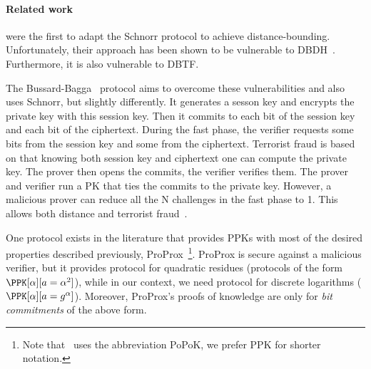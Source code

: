 \paragraph*{Related work}%
\label{related-work}

\textcite{DistanceBounding} were the first to adapt the Schnorr
protocol to achieve distance-bounding.
Unfortunately, their approach has been shown to be vulnerable to 
\ac{DBDH}~\cite{DistanceBounding,TamarinDB}.
Furthermore, it is also vulnerable to \ac{DBTF}.

The Bussard-Bagga~\cite{Bussard-Bagga} protocol aims to overcome these
vulnerabilities and also uses Schnorr, but slightly
differently. It generates a sesson key and encrypts the private key
with this session key. Then it commits to each bit of the session key
and each bit of the ciphertext. During the fast phase, the verifier requests some bits from the session key and some from the ciphertext. Terrorist fraud is based on that knowing both session key and ciphertext one can compute the private key.
The prover then opens the commits, the verifier verifies them.
The prover and verifier run a \ac{PK} that ties the commits to the private key.
However, a malicious prover can reduce all the N challenges in the fast phase
to 1. This allows both distance and terrorist
fraud~\cite{Bussard-Bagga-attack}.

One protocol exists in the literature that provides \acp{PPK} with most of the desired properties described previously, ProProx~\cite{ProProx}\footnote{Note that~\cite{ProProx} uses the abbreviation PoPoK, we prefer \acs{PPK} for shorter notation.}.
ProProx is secure against a malicious verifier, but it provides  
protocol for quadratic residues (\ie protocols of the form \(
  \PPK[\alpha][a = \alpha^2]
\)), while in our context, we need  protocol for discrete logarithms 
(\ie \(\PPK[\alpha][a = g^\alpha]\)). %
Moreover, ProProx's proofs of knowledge are only for \emph{bit commitments} of the 
above form. %

